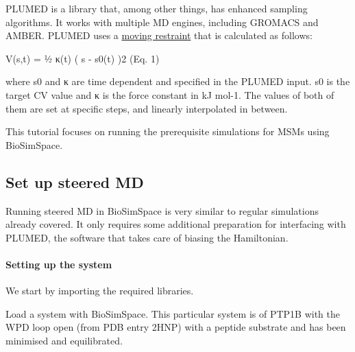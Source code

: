 PLUMED is a library that, among other things, has enhanced sampling
algorithms. It works with multiple MD engines, including GROMACS and
AMBER. PLUMED uses a
\href{https://www.plumed.org/doc-v2.5/user-doc/html/_m_o_v_i_n_g_r_e_s_t_r_a_i_n_t.html}{moving
restraint} that is calculated as follows:

V(s⃗,t) = 1⁄2 κ(t) ( s⃗ - s⃗0(t) )2 (Eq. 1)

where s⃗0 and κ are time dependent and specified in the PLUMED input.
s⃗0 is the target CV value and κ is the force constant in kJ mol-1. The
values of both of them are set at specific steps, and linearly
interpolated in between.

This tutorial focuses on running the prerequisite simulations for MSMs
using BioSimSpace.

\hypertarget{set-up-steered-md}{%
\subsection{Set up steered MD}\label{set-up-steered-md}}

Running steered MD in BioSimSpace is very similar to regular simulations
already covered. It only requires some additional preparation for
interfacing with PLUMED, the software that takes care of biasing the
Hamiltonian.

\hypertarget{setting-up-the-system}{%
\paragraph{Setting up the system}\label{setting-up-the-system}}

We start by importing the required libraries.

\begin{Shaded}
\begin{Highlighting}[]
\end{Highlighting}
\end{Shaded}

Load a system with BioSimSpace. This particular system is of PTP1B with
the WPD loop open (from PDB entry 2HNP) with a peptide substrate and has
been minimised and equilibrated.

\begin{Shaded}
\begin{Highlighting}[]
\OperatorTok{=}\NormalTok{ BSS.IO.readMolecules([}\NormalTok{, }\NormalTok{])}
\end{Highlighting}
\end{Shaded}

